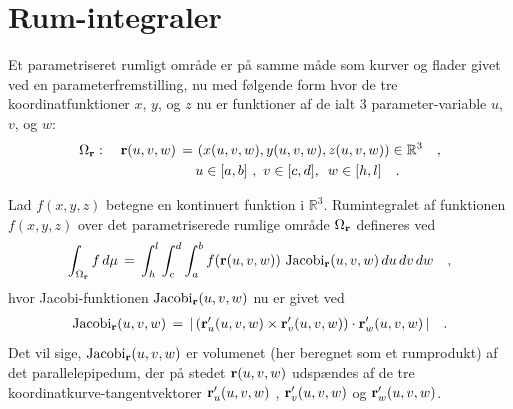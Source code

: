 




\section{Rum-integraler} \label{secRumInt}


Et parametriseret {rumligt område} er på samme måde som kurver og
flader givet ved en parameterfremstilling, nu med følgende form hvor de tre koordinatfunktioner $x$, $y$, og $z$ nu er funktioner af de ialt $3$ parameter-variable $u$, $v$, og $w$:
\begin{equation}
\label{eqRumOmr}
\begin{aligned}
\Omega_{\bf r}: \quad {\bf r}(u,v,w) \, = \, &\left(x(u,v,w),
y(u,v,w), z(u,v,w)\right) \in \mathbb{R}^3 \quad , \\ \, \, \,  &u
\in [a, b] \, \, , \, \,  v \in [c,d] , \, \, \,  w \in [h,
l]\quad.
\end{aligned}
\end{equation}


\begin{definition}[Rumintegral] \label{defRumInt}
Lad $f(x,y,z)$ betegne en kontinuert funktion i $\mathbb{R}^{3}$.
Rumintegralet af funktionen $f(x,y,z)$ over det parametriserede rumlige
område $\Omega_{\bf r}$ defineres ved
\begin{equation} \label{eqRumintegral}
\int_{\Omega_{\bf r}} f \, d\mu \, = \, \int_{h}^{l}\int_{c}^{d}
\int_{a}^{b} f({\bf r}(u,v,w))\, \operatorname{Jacobi}_{\bf r}(u,v,w)\, du \, dv \,
dw \quad,
\end{equation}
hvor {Jacobi-funktionen $\operatorname{Jacobi}_{\bf r}(u,v,w)$} nu er givet ved
\begin{equation}
\begin{aligned}
 \operatorname{Jacobi}_{\bf r}(u,v,w)\, = \, | \,({\bf r}'_{u}(u,v,w)\times{\bf
 r}'_{v}(u,v,w))\cdot{\bf r}'_{w}(u,v,w)\, |
         \quad .
 \end{aligned}
\end{equation}
Det vil sige, $\operatorname{Jacobi}_{\bf r}(u,v,w)$ er volumenet (her beregnet som et rumprodukt) af
det parallelepipedum, der på stedet ${\bf
r}(u,v,w)$ udspændes af de tre
koordinatkurve-tangentvektorer ${\bf
r}'_{u}(u,v,w)$ , ${\bf
 r}'_{v}(u,v,w)$ og ${\bf
r}'_{w}(u,v,w)$.
\end{definition}

